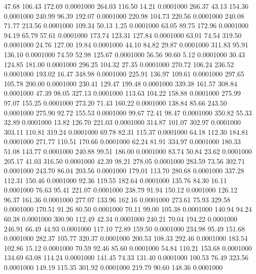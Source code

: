   47.68  106.43  172.69   0.0001000
 264.03  116.50   14.21   0.0001000
 266.37   43.13  154.36   0.0001000
 240.99   96.39  192.07   0.0001000
 220.98  104.73  220.56   0.0001000
 240.08   71.77  213.56   0.0001000
 109.34   50.13    1.25   0.0001000
  63.05   89.75  172.96   0.0001000
  94.19   65.79   57.61   0.0001000
 173.74  123.31  127.84   0.0001000
  63.01   74.54  319.50   0.0001000
  24.76  127.00   19.84   0.0001000
  44.10   84.82   29.87   0.0001000
 311.83   95.91  136.10   0.0001000
  74.59   52.98  125.67   0.0001000
  56.56   90.60    5.12   0.0001000
  30.43  124.85  181.00   0.0001000
 296.25  104.32   27.35   0.0001000
 270.72  106.24  236.52   0.0001000
 193.02   16.47  348.98   0.0001000
 225.91  136.97  109.61   0.0001000
 297.65  105.78  200.00   0.0001000
 230.41  129.47  199.48   0.0001000
 339.38  161.57  308.84   0.0001000
  47.39   98.05  327.13   0.0001000
 113.63  104.22  158.88   0.0001000
 275.99   97.07  155.25   0.0001000
 273.20   71.43  160.22   0.0001000
 138.84   85.66  243.50   0.0001000
 275.90   92.72  155.53   0.0001000
  99.67   72.41   98.47   0.0001000
 350.82   55.33   32.89   0.0001000
  13.82  126.70  221.03   0.0001000
 314.87  101.07  302.97   0.0001000
 303.11  110.81  319.24   0.0001000
  69.78   82.31  115.37   0.0001000
  64.18  112.30  184.81   0.0001000
 271.77  110.51  170.66   0.0001000
  62.24   81.91  334.97   0.0001000
 180.33   51.08  143.77   0.0001000
 240.88   99.51  186.00   0.0001000
  83.74   50.84   23.62   0.0001000
 205.17   41.03  316.50   0.0001000
  42.39   98.21  278.05   0.0001000
 283.59   73.56  302.71   0.0001000
 243.70   86.04  203.56   0.0001000
 179.01  113.70  280.68   0.0001000
 337.28  112.31  150.46   0.0001000
  92.36  119.55  182.64   0.0001000
 135.76   84.30   16.11   0.0001000
  76.63   95.41  221.07   0.0001000
 238.79   91.94  150.12   0.0001000
 126.12   96.37  161.36   0.0001000
 277.07  133.96  162.16   0.0001000
 273.61   75.93  329.58   0.0001000
 170.51   91.26   80.50   0.0001000
  70.11   99.00  105.38   0.0001000
 140.94   94.24   60.38   0.0001000
 300.90  112.49   42.34   0.0001000
 240.21   70.04  194.22   0.0001000
 246.91   66.49   44.93   0.0001000
 117.10   72.89  159.50   0.0001000
 234.98   95.49  151.68   0.0001000
 282.37  105.77  320.37   0.0001000
 200.53  108.33  292.46   0.0001000
 183.54  102.86   15.12   0.0001000
  70.59   92.46   85.60   0.0001000
  54.84  110.21  153.68   0.0001000
 134.69   63.08  114.24   0.0001000
 141.45   74.33  131.40   0.0001000
 100.53   76.49  323.56   0.0001000
 149.19  115.35  301.92   0.0001000
 219.79   90.60  148.36   0.0001000
